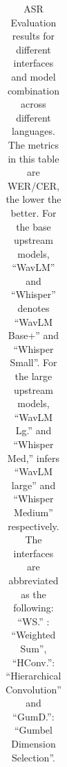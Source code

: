 \begin{table}[h!]
    \setlength{\tabcolsep}{4pt}
  \caption{ASR Evaluation results for different interfaces and model combination across different languages. The metrics in this table are WER/CER, the lower the better. 
  For the base upstream models, ``WavLM'' and  ``Whisper'' denotes ``WavLM Base+'' and ``Whisper Small''. 
  For the large upstream models, ``WavLM Lg.'' and ``Whisper Med,'' infers ``WavLM large'' and ``Whisper Medium'' respectively.
  The interfaces are abbreviated as the following: ``WS.'' : ``Weighted Sum'', ``HConv.'': ``Hierarchical Convolution'' and ``GumD.'': ``Gumbel Dimension Selection''.}
  \label{tab:mono1h_diff_lang}
\normalsize
  \centering
  \begin{tabular}{cccccccccccccccc}
    \hline
    

\end{tabular}
\end{table}
